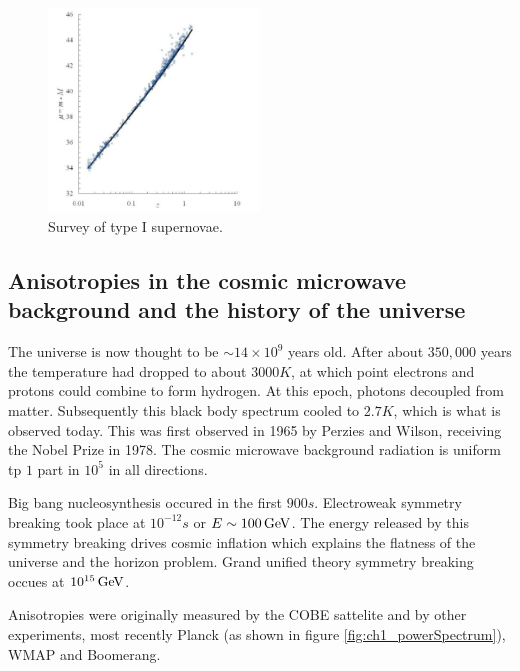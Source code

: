 \begin{figure}[!htb]
  \begin{center}
    \includegraphics[width=0.5\textwidth]{images/chapter_1/type1Supernovae.pdf}
    \caption[Survey of type I supernovae]{Survey of type I supernovae. \cite{typeOneSupernovae}}
    \label{fig:ch1_type1Supernovae}
  \end{center}
\end{figure}

\subsection{Anisotropies in the cosmic microwave background and the history of the universe}

The universe is now thought to be $\sim 14 \times 10^9$ years old.  After about $350,000$ years the temperature had dropped to about $3000K$, at which point electrons and protons could combine to form hydrogen.  At this epoch, photons decoupled from matter.  Subsequently this black body spectrum cooled to $2.7K$, which is what is observed today.  This was first observed in 1965 by Perzies and Wilson, receiving the Nobel Prize in 1978.  The cosmic microwave background radiation is uniform tp $1$ part in $10^5$ in all directions.

Big bang nucleosynthesis occured in the first $900s$.  Electroweak symmetry breaking took place at $10^{-12}s$ or $E\sim 100\mathrm{\,GeV}$.  The energy released by this symmetry breaking drives cosmic inflation which explains the flatness of the universe and the horizon problem.  Grand unified theory symmetry breaking occues at $10^{15} \mathrm{\,GeV}$.

Anisotropies were originally measured by the COBE sattelite and by other experiments, most recently Planck (as shown in figure \ref{fig:ch1_powerSpectrum}), WMAP and Boomerang.

